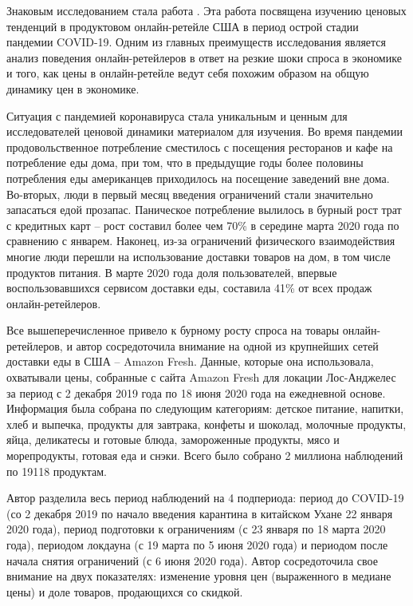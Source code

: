 Знаковым исследованием стала работа \cite{hillen2021covid}. Эта работа посвящена изучению ценовых тенденций в продуктовом онлайн-ретейле США в период острой стадии пандемии COVID-19. Одним из главных преимуществ исследования является анализ поведения онлайн-ретейлеров в ответ на резкие шоки спроса в экономике и того, как цены в онлайн-ретейле ведут себя похожим образом на общую динамику цен в экономике.

Ситуация с пандемией коронавируса стала уникальным и ценным для исследователей ценовой динамики материалом для изучения. Во время пандемии продовольственное потребление сместилось с посещения ресторанов и кафе на потребление еды дома, при том, что в предыдущие годы более половины потребления еды американцев приходилось на посещение заведений вне дома. Во-вторых, люди в первый месяц введения ограничений стали значительно запасаться едой прозапас. Паническое потребление вылилось в бурный рост трат с кредитных карт – рост составил более чем 70\% в середине марта 2020 года по сравнению с январем. Наконец, из-за ограничений физического взаимодействия многие люди перешли на использование доставки товаров на дом, в том числе продуктов питания. В марте 2020 года доля пользователей, впервые воспользовавшихся сервисом доставки еды, составила 41\% от всех продаж онлайн-ретейлеров.

Все вышеперечисленное привело к бурному росту спроса на товары онлайн-ретейлеров, и автор сосредоточила внимание на одной из крупнейших сетей доставки еды в США – Amazon Fresh. Данные, которые она использовала, охватывали цены, собранные с сайта Amazon Fresh для локации Лос-Анджелес за период с 2 декабря 2019 года по 18 июня 2020 года на ежедневной основе. Информация была собрана по следующим категориям: детское питание, напитки, хлеб и выпечка, продукты для завтрака, конфеты и шоколад, молочные продукты, яйца, деликатесы и готовые блюда, замороженные продукты, мясо и морепродукты, готовая еда и снэки. Всего было собрано 2 миллиона наблюдений по 19118 продуктам.

Автор разделила весь период наблюдений на 4 подпериода: период до COVID-19 (со 2 декабря 2019 по начало введения карантина в китайском Ухане 22 января 2020 года), период подготовки к ограничениям (с 23 января по 18 марта 2020 года), периодом локдауна (с 19 марта по 5 июня 2020 года) и периодом после начала снятия ограничений (с 6 июня 2020 года). Автор сосредоточила свое внимание на двух показателях: изменение уровня цен (выраженного в медиане цены) и доле товаров, продающихся со скидкой.

